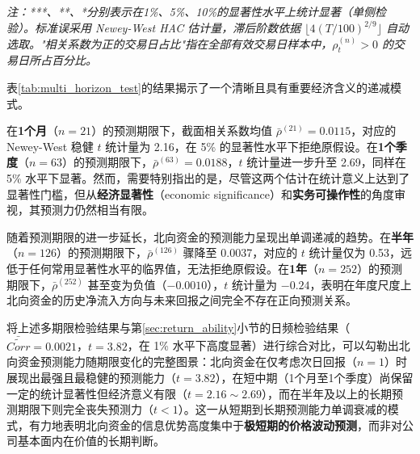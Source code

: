 \documentclass{article}
\begin{document}
\begin{table}[htbp]
    \centering
    \caption{不同预测期限下北向资金净流入与未来回报截面相关系数的 Newey-West 稳健检验}
    \label{tab:multi_horizon_test}
    \vspace{0.5em}
    \begin{minipage}{0.95\textwidth}
        \footnotesize\textit{注：***、**、*分别表示在1\%、5\%、10\%的显著性水平上统计显著（单侧检验）。标准误采用 Newey-West HAC 估计量，滞后阶数依据 $\lfloor 4(T/100)^{2/9} \rfloor$ 自动选取。"相关系数为正的交易日占比"指在全部有效交易日样本中，$\rho_t^{(n)} > 0$ 的交易日所占百分比。}
    \end{minipage}
\end{table}

表\ref{tab:multi_horizon_test}的结果揭示了一个清晰且具有重要经济含义的递减模式。

在\textbf{1个月}（$n=21$）的预测期限下，截面相关系数均值 $\bar{\rho}^{(21)} = 0.0115$，对应的 Newey-West 稳健 $t$ 统计量为 2.16，在 5\% 的显著性水平下拒绝原假设。在\textbf{1个季度}（$n=63$）的预测期限下，$\bar{\rho}^{(63)} = 0.0188$，$t$ 统计量进一步升至 2.69，同样在 5\% 水平下显著。然而，需要特别指出的是，尽管这两个估计在统计意义上达到了显著性门槛，但从\textbf{经济显著性}（economic significance）和\textbf{实务可操作性}的角度审视，其预测力仍然相当有限。

随着预测期限的进一步延长，北向资金的预测能力呈现出单调递减的趋势。在\textbf{半年}（$n=126$）的预测期限下，$\bar{\rho}^{(126)}$ 骤降至 0.0037，对应的 $t$ 统计量仅为 0.53，远低于任何常用显著性水平的临界值，无法拒绝原假设。在\textbf{1年}（$n=252$）的预测期限下，$\bar{\rho}^{(252)}$ 甚至变为负值（$-0.0010$），$t$ 统计量为 $-0.24$，表明在年度尺度上北向资金的历史净流入方向与未来回报之间完全不存在正向预测关系。

将上述多期限检验结果与第\ref{sec:return_ability}小节的日频检验结果（$\bar{\widetilde{Corr}} = 0.0021$，$t = 3.82$，在 1\% 水平下高度显著）进行综合对比，可以勾勒出北向资金预测能力随期限变化的完整图景：北向资金在仅考虑次日回报（$n=1$）时展现出最强且最稳健的预测能力（$t = 3.82$），在短中期（1个月至1个季度）尚保留一定的统计显著性但经济意义有限（$t = 2.16 \sim 2.69$），而在半年及以上的长期预测期限下则完全丧失预测力（$t < 1$）。这一从短期到长期预测能力单调衰减的模式，有力地表明北向资金的信息优势高度集中于\textbf{极短期的价格波动预测}，而非对公司基本面内在价值的长期判断。
\end{document}

